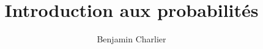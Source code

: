 \documentclass[10pt]{book}
\title{Introduction aux probabilités}
\author{Benjamin Charlier}
\begin{document}
\maketitle


\tikzexternaldisable








%
\end{document}
